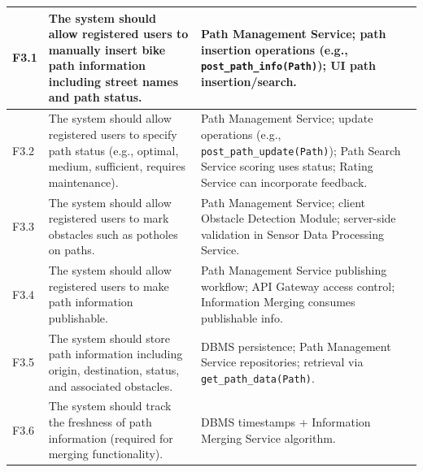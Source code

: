 \begin{longtable}{|p{}|p{}|p{}|}
    F3.1 & The system should allow registered users to manually insert bike path information including street names and path status. &
    Path Management Service; path insertion operations (e.g., \texttt{post\_path\_info(Path)}); UI path insertion/search. \\
    \hline
    F3.2 & The system should allow registered users to specify path status (e.g., optimal, medium, sufficient, requires maintenance). &
    Path Management Service; update operations (e.g., \texttt{post\_path\_update(Path)}); Path Search Service scoring uses status; Rating Service can incorporate feedback. \\
    \hline
    F3.3 & The system should allow registered users to mark obstacles such as potholes on paths. &
    Path Management Service; client Obstacle Detection Module; server-side validation in Sensor Data Processing Service. \\
    \hline
    F3.4 & The system should allow registered users to make path information publishable. &
    Path Management Service publishing workflow; API Gateway access control; Information Merging consumes publishable info. \\
    \hline
    F3.5 & The system should store path information including origin, destination, status, and associated obstacles. &
    DBMS persistence; Path Management Service repositories; retrieval via \texttt{get\_path\_data(Path)}. \\
    \hline
    F3.6 & The system should track the freshness of path information (required for merging functionality). &
    DBMS timestamps + Information Merging Service algorithm. \\
    \hline


\end{longtable}
